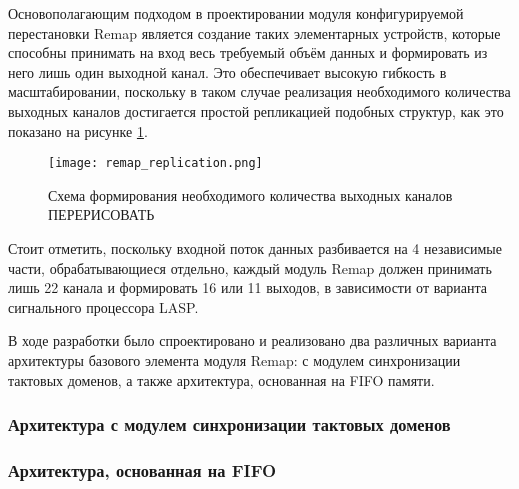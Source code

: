 Основополагающим подходом в проектировании модуля конфигурируемой перестановки Remap является создание таких элементарных устройств, которые способны принимать на вход весь требуемый объём данных и формировать из него лишь один выходной канал. Это обеспечивает высокую гибкость в масштабировании, поскольку в таком случае реализация необходимого количества выходных каналов достигается простой репликацией подобных структур, как это показано на рисунке \ref{fig:remap_replication}.\par

\begin{figure}[ht]
    \centering
    \texttt{[image: remap\_replication.png]}
    \caption{Схема формирования необходимого количества выходных каналов ПЕРЕРИСОВАТЬ}
    \label{fig:remap_replication}
\end{figure}\par

Стоит отметить, поскольку входной поток данных разбивается на 4 независимые части, обрабатывающиеся отдельно, каждый модуль Remap должен принимать лишь 22 канала и формировать 16 или 11 выходов, в зависимости от варианта сигнального процессора LASP.\par
В ходе разработки было спроектировано и реализовано два различных варианта архитектуры базового элемента модуля Remap: с модулем синхронизации тактовых доменов, а также архитектура, основанная на FIFO памяти.\par

\subsubsection{Архитектура с модулем синхронизации тактовых доменов}


\subsubsection{Архитектура, основанная на FIFO}

